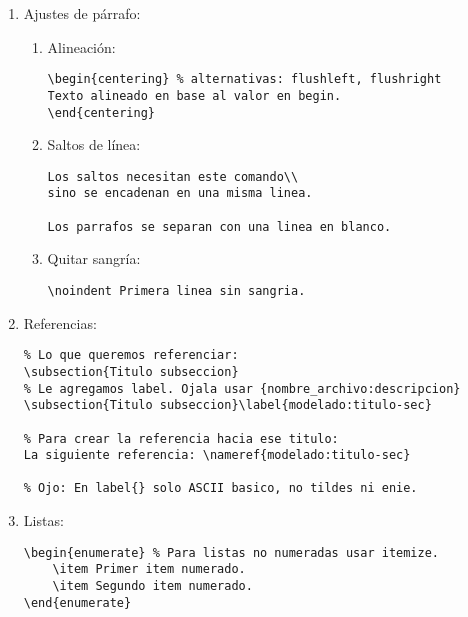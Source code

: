 \begin{enumerate}
\item Ajustes de párrafo:
	\begin{enumerate}
	\item Alineación:
	\begin{lstlisting}
\begin{centering} % alternativas: flushleft, flushright
Texto alineado en base al valor en begin.
\end{centering}
	\end{lstlisting}
	\item Saltos de línea:
	\begin{lstlisting}
Los saltos necesitan este comando\\
sino se encadenan en una misma linea.

Los parrafos se separan con una linea en blanco.
	\end{lstlisting}

	\item Quitar sangría:
	\begin{lstlisting}
\noindent Primera linea sin sangria.
	\end{lstlisting}
	\end{enumerate}

\item Referencias:
\begin{lstlisting}
% Lo que queremos referenciar:
\subsection{Titulo subseccion}
% Le agregamos label. Ojala usar {nombre_archivo:descripcion}
\subsection{Titulo subseccion}\label{modelado:titulo-sec}

% Para crear la referencia hacia ese titulo:
La siguiente referencia: \nameref{modelado:titulo-sec}

% Ojo: En label{} solo ASCII basico, no tildes ni enie.
\end{lstlisting}

\item Listas:
\begin{lstlisting}
\begin{enumerate} % Para listas no numeradas usar itemize.
    \item Primer item numerado.
    \item Segundo item numerado.
\end{enumerate}
\end{lstlisting}


\end{enumerate}
